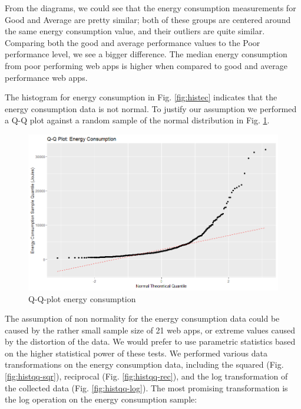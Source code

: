 From the diagrams, we could see that the energy consumption measurements for Good and Average are pretty similar; both of these groups are centered around the same energy consumption value, and their outliers are quite similar. Comparing both the good and average performance values to the Poor performance level, we see a bigger difference. The median energy consumption from poor performing web apps is higher when compared to good and average performance web apps. \newline

The histogram for energy consumption in Fig. \ref{fig:histec} indicates that the energy consumption data is not normal. To justify our assumption we performed a Q-Q plot against a random sample of the normal distribution in Fig. \ref{fig:qqec}.

\begin{figure}[H]
  \includegraphics[width=\linewidth]{./Images/QQPlot_Energy_Consumption.png}
  \caption{Q-Q-plot energy consumption}
  \label{fig:qqec}
\end{figure}

The assumption of non normality for the energy consumption data could be caused by the rather small sample size of 21 web apps, or extreme values caused by the distortion of the data. We would prefer to use parametric statistics based on the higher statistical power of these tests. We performed various data transformations on the energy consumption data, including the squared (Fig. \ref{fig:histqq-sqr}), reciprocal (Fig. \ref{fig:histqq-rec}), and the log transformation of the collected data (Fig. \ref{fig:histqq-log}). The most promising transformation is the log operation on the energy consumption sample:

